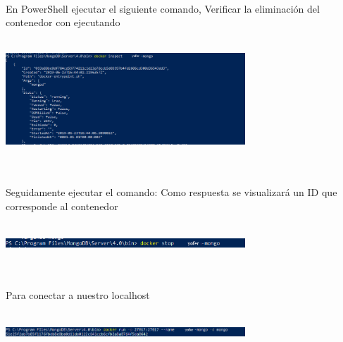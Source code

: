 \documentclass[twoside,onecolumn]{article}
\begin{document}
\begin{flushright}
\begin{itemize}
\textbf{}\\
En PowerShell ejecutar el siguiente comando, Verificar la eliminación del contenedor con ejecutando
\textbf{}\\
\textbf{}\\
\begin{center}
		\includegraphics[width=9cm]{./Imagenes/9d}
		\end{center}	
\textbf{}\\
\textbf{}\\

Seguidamente ejecutar el comando: Como respuesta
se visualizará un ID que corresponde al contenedor
\textbf{}\\
\textbf{}\\
\begin{center}
		\includegraphics[width=9cm]{./Imagenes/10d}
		\end{center}	
\textbf{}\\
\textbf{}\\

Para conectar a nuestro localhost
\textbf{}\\
\textbf{}\\
\begin{center}
		\includegraphics[width=9cm]{./Imagenes/11d}
		\end{center}	
\textbf{}\\
\textbf{}\\


\end{itemize}
\end{flushright}
\end{document}
